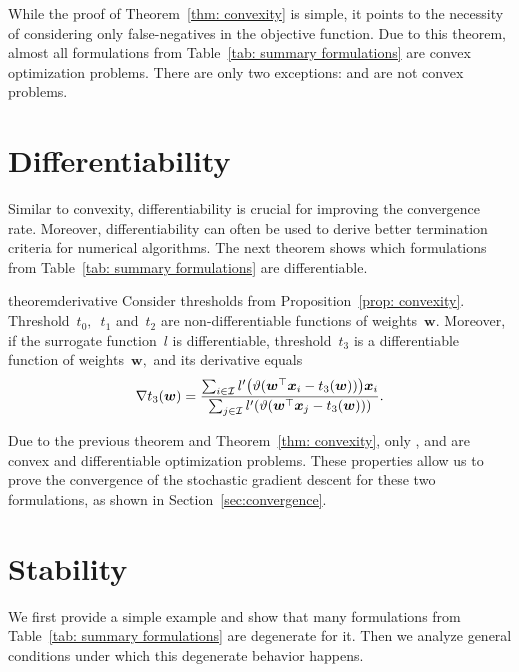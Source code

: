 While the proof of Theorem~\ref{thm: convexity} is simple, it points to the necessity of considering only false-negatives in the objective function. Due to this theorem, almost all formulations from Table~\ref{tab: summary formulations} are convex optimization problems. There are only two exceptions: \Grill and \GrillNP are not convex problems.

\section{Differentiability}

Similar to convexity, differentiability is crucial for improving the convergence rate. Moreover, differentiability can often be used to derive better termination criteria for numerical algorithms. The next theorem shows which formulations from Table~\ref{tab: summary formulations} are differentiable.

\begin{restatable}{theorem}{derivative}\label{thm: differentiability}
  Consider thresholds from Proposition~\ref{prop: convexity}.  Threshold~$t_0,$~$t_1$ and~$t_2$ are non-differentiable functions of weights~$\bm{w}.$ Moreover, if the surrogate function~$l$ is differentiable, threshold~$t_3$ is a differentiable function of weights~$\bm{w},$ and its derivative equals
  \begin{equation*}
    \nabla t_3(\bm{w}) = \frac{
      \sum_{i \in \I} l'\Brac{\vartheta (\bm{w}^{\top} \bm{x}_i - t_3(\bm{w}))}\bm{x}_i
      }{
        \sum_{j \in \I} l'\Brac{\vartheta (\bm{w}^{\top} \bm{x}_j - t_3(\bm{w}))}
      }.
  \end{equation*}
\end{restatable}

Due to the previous theorem and Theorem~\ref{thm: convexity}, only \PatMat, and \PatMatNP are convex and differentiable optimization problems. These properties allow us to prove the convergence of the stochastic gradient descent for these two formulations, as shown in Section~\ref{sec:convergence}.

\section{Stability}\label{sec: stability}

We first provide a simple example and show that many formulations from Table~\ref{tab: summary formulations} are degenerate for it. Then we analyze general conditions under which this degenerate behavior happens.

